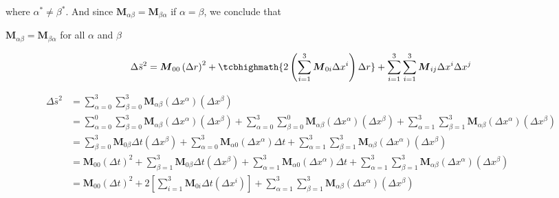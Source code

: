 where $\alpha^* \ne \beta^*$. And since $\boldsymbol{M}_{\alpha\beta} = \boldsymbol{M}_{\beta\alpha}$ if $\alpha = \beta$, we conclude that

\begin{tcolorbox}[colback=green!5!white, colframe=green!75!black]
    \begin{center}
        $\boldsymbol{M}_{\alpha\beta} = \boldsymbol{M}_{\beta\alpha}$ for all $\alpha$ and $\beta$
    \end{center}
\end{tcolorbox}

\begin{tcolorbox}[
    colback=green!5!white,
    colframe=green!75!black,
    colbacktitle=red!30!white,
    enhanced,
    attach boxed title to top center={yshift=-2mm},
    title={
        \parbox{10cm}{
            Why do we have the 2nd term in equation
        }
    }]

    \[
        \Delta\bar{s}^2 = \boldsymbol{M}_{00}\left(\Delta r\right)^2 + \tcbhighmath{2\left( \sum_{i = 1}^3\boldsymbol{M}_{0i}\Delta x^i \right)\Delta r} + \sum_{i = 1}^3\sum_{i = 1}^3 \boldsymbol{M}_{ij}\Delta x^i\Delta x^j
    \]
\end{tcolorbox}

\begin{align}
    \Delta\bar{s}^2 &= \sum_{\alpha = 0}^3\sum_{\beta = 0}^3 \boldsymbol{M}_{\alpha\beta}\left(\Delta x^{\alpha}\right)\left(\Delta x^{\beta}\right) \\
    &= \sum_{\alpha = 0}^0\sum_{\beta = 0}^3 \boldsymbol{M}_{\alpha\beta}\left(\Delta x^{\alpha}\right)\left(\Delta x^{\beta}\right) + \sum_{\alpha = 0}^3\sum_{\beta = 0}^0 \boldsymbol{M}_{\alpha\beta}\left(\Delta x^{\alpha}\right)\left(\Delta x^{\beta}\right) + \sum_{\alpha = 1}^3\sum_{\beta = 1}^3 \boldsymbol{M}_{\alpha\beta}\left(\Delta x^{\alpha}\right)\left(\Delta x^{\beta}\right) \\
    &= \sum_{\beta = 0}^3 \boldsymbol{M}_{0\beta}\Delta t \left(\Delta x^{\beta}\right) + \sum_{\alpha = 0}^3 \boldsymbol{M}_{\alpha0}\left(\Delta x^{\alpha}\right)\Delta t + \sum_{\alpha = 1}^3\sum_{\beta = 1}^3 \boldsymbol{M}_{\alpha\beta}\left(\Delta x^{\alpha}\right)\left(\Delta x^{\beta}\right) \\
    &= \boldsymbol{M}_{00}\left( \Delta t \right)^2 + \sum_{\beta = 1}^3 \boldsymbol{M}_{0\beta}\Delta t \left(\Delta x^{\beta}\right) + \sum_{\alpha = 1}^3 \boldsymbol{M}_{\alpha0}\left(\Delta x^{\alpha}\right)\Delta t + \sum_{\alpha = 1}^3\sum_{\beta = 1}^3 \boldsymbol{M}_{\alpha\beta}\left(\Delta x^{\alpha}\right)\left(\Delta x^{\beta}\right) \\
    &= \boldsymbol{M}_{00}\left( \Delta t \right)^2 + \boxed{2\left[ \sum_{i = 1}^3\boldsymbol{M}_{0i}\Delta t \left(\Delta x^i\right) \right]} + \sum_{\alpha = 1}^3\sum_{\beta = 1}^3 \boldsymbol{M}_{\alpha\beta}\left(\Delta x^{\alpha}\right)\left(\Delta x^{\beta}\right) \label{eq:expand}
\end{align}

